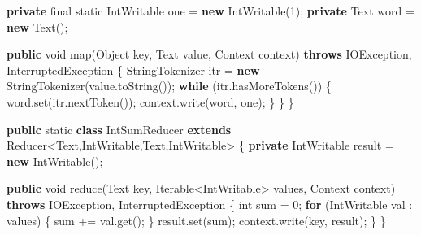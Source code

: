 \documentclass[
]{article}
\newenvironment{Shaded}{}{}
\newcommand{\BuiltInTok}[1]{\textcolor[rgb]{0.00,0.50,0.00}{#1}}
\newcommand{\ControlFlowTok}[1]{\textcolor[rgb]{0.00,0.44,0.13}{\textbf{#1}}}
\newcommand{\DataTypeTok}[1]{\textcolor[rgb]{0.56,0.13,0.00}{#1}}
\newcommand{\DecValTok}[1]{\textcolor[rgb]{0.25,0.63,0.44}{#1}}
\newcommand{\FunctionTok}[1]{\textcolor[rgb]{0.02,0.16,0.49}{#1}}
\newcommand{\KeywordTok}[1]{\textcolor[rgb]{0.00,0.44,0.13}{\textbf{#1}}}
\newcommand{\NormalTok}[1]{#1}
\newcommand{\OperatorTok}[1]{\textcolor[rgb]{0.40,0.40,0.40}{#1}}
\begin{document}
\begin{Shaded}
\begin{Highlighting}[]
    \KeywordTok{private} \DataTypeTok{final} \DataTypeTok{static}\NormalTok{ IntWritable one }\OperatorTok{=} \KeywordTok{new} \FunctionTok{IntWritable}\OperatorTok{(}\DecValTok{1}\OperatorTok{);}
    \KeywordTok{private} \BuiltInTok{Text}\NormalTok{ word }\OperatorTok{=} \KeywordTok{new} \BuiltInTok{Text}\OperatorTok{();}

    \KeywordTok{public} \DataTypeTok{void} \FunctionTok{map}\OperatorTok{(}\BuiltInTok{Object}\NormalTok{ key}\OperatorTok{,} \BuiltInTok{Text}\NormalTok{ value}\OperatorTok{,} \BuiltInTok{Context}\NormalTok{ context}\OperatorTok{)} \KeywordTok{throws} \BuiltInTok{IOException}\OperatorTok{,}
                          \BuiltInTok{InterruptedException} \OperatorTok{\{}
      \BuiltInTok{StringTokenizer}\NormalTok{ itr }\OperatorTok{=} \KeywordTok{new} \BuiltInTok{StringTokenizer}\OperatorTok{(}\NormalTok{value}\OperatorTok{.}\FunctionTok{toString}\OperatorTok{());}
      \ControlFlowTok{while} \OperatorTok{(}\NormalTok{itr}\OperatorTok{.}\FunctionTok{hasMoreTokens}\OperatorTok{())} \OperatorTok{\{}
\NormalTok{        word}\OperatorTok{.}\FunctionTok{set}\OperatorTok{(}\NormalTok{itr}\OperatorTok{.}\FunctionTok{nextToken}\OperatorTok{());}
\NormalTok{        context}\OperatorTok{.}\FunctionTok{write}\OperatorTok{(}\NormalTok{word}\OperatorTok{,}\NormalTok{ one}\OperatorTok{);}
      \OperatorTok{\}}
    \OperatorTok{\}}
  \OperatorTok{\}}

  \KeywordTok{public} \DataTypeTok{static} \KeywordTok{class}\NormalTok{ IntSumReducer }\KeywordTok{extends}\NormalTok{ Reducer}\OperatorTok{\textless{}}\BuiltInTok{Text}\OperatorTok{,}\NormalTok{IntWritable}\OperatorTok{,}\BuiltInTok{Text}\OperatorTok{,}\NormalTok{IntWritable}\OperatorTok{\textgreater{}} \OperatorTok{\{}
    \KeywordTok{private}\NormalTok{ IntWritable result }\OperatorTok{=} \KeywordTok{new} \FunctionTok{IntWritable}\OperatorTok{();}

    \KeywordTok{public} \DataTypeTok{void} \FunctionTok{reduce}\OperatorTok{(}\BuiltInTok{Text}\NormalTok{ key}\OperatorTok{,} \BuiltInTok{Iterable}\OperatorTok{\textless{}}\NormalTok{IntWritable}\OperatorTok{\textgreater{}}\NormalTok{ values}\OperatorTok{,} \BuiltInTok{Context}\NormalTok{ context}\OperatorTok{)} \KeywordTok{throws}
                          \BuiltInTok{IOException}\OperatorTok{,} \BuiltInTok{InterruptedException} \OperatorTok{\{}
      \DataTypeTok{int}\NormalTok{ sum }\OperatorTok{=} \DecValTok{0}\OperatorTok{;}
      \ControlFlowTok{for} \OperatorTok{(}\NormalTok{IntWritable val }\OperatorTok{:}\NormalTok{ values}\OperatorTok{)} \OperatorTok{\{}
\NormalTok{        sum }\OperatorTok{+=}\NormalTok{ val}\OperatorTok{.}\FunctionTok{get}\OperatorTok{();}
      \OperatorTok{\}}
\NormalTok{      result}\OperatorTok{.}\FunctionTok{set}\OperatorTok{(}\NormalTok{sum}\OperatorTok{);}
\NormalTok{      context}\OperatorTok{.}\FunctionTok{write}\OperatorTok{(}\NormalTok{key}\OperatorTok{,}\NormalTok{ result}\OperatorTok{);}
    \OperatorTok{\}}
  \OperatorTok{\}}


\end{Highlighting}
\end{Shaded}
\end{document}
